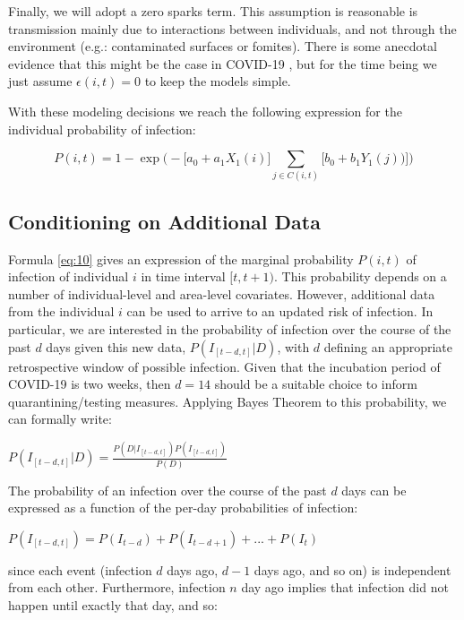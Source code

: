 \documentclass{article}
\begin{document}
Finally, we will adopt a zero sparks term. This assumption is reasonable is transmission mainly due to interactions between individuals, and not through the environment (e.g.: contaminated surfaces or fomites). There is some anecdotal evidence that this might be the case in COVID-19 \cite{Ferretti2020}, but for the time being we just assume $\epsilon(i, t)=0$ to keep the models simple.

With these modeling decisions we reach the following expression for the individual probability of infection:

\begin{equation}
P(i, t)=1-\exp\Big( -\big[a_0 + a_1 X_1(i)] \sum\limits_{j \in C(i, t)} \big[b_0 + b_1 Y_1(j))] \Big)\label{eq:10}
\end{equation}

\subsection{Conditioning on Additional Data}

Formula \eqref{eq:10} gives an expression of the marginal probability $P(i, t)$ of infection of individual $i$ in time interval $[t,t+1)$. This probability depends on a number of individual-level and area-level covariates. However, additional data from the individual $i$ can be used to arrive to an updated risk of infection. In particular, we are interested in the probability of infection over the course of the past $d$ days given this new data, $P(I_{[t-d, t]}|D)$, with $d$ defining an appropriate retrospective window of possible infection. Given that the incubation period of COVID-19 is two weeks, then $d=14$ should be a suitable choice to inform quarantining/testing measures. Applying Bayes Theorem to this probability, we can formally write:

\begin{center}
$P(I_{[t-d, t]}|D)=\frac{P(D|I_{[t-d, t]})P(I_{[t-d, t]})}{P(D)}$
\end{center}

The probability of an infection over the course of the past $d$ days can be expressed as a function of the per-day probabilities of infection:

\begin{center}
$P(I_{[t-d, t]}) = P(I_{t-d}) + P(I_{t-d+1}) + ... + P(I_{t})$
\end{center}

since each event (infection $d$ days ago, $d-1$ days ago, and so on) is independent from each other. Furthermore, infection $n$ day ago implies that infection did not happen until exactly that day, and so:
\end{document}
